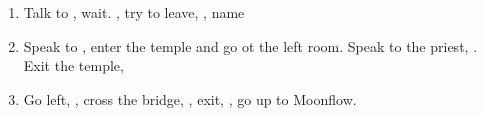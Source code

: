 \begin{enumerate}[resume]
	\item Talk to \auron, wait. \sd, try to leave, \sd, name \ixilon
	\item Speak to \auron, enter the temple and go ot the left room. Speak to the priest, \sd. Exit the temple, \sd
	\item Go left, , cross the bridge, \sd, exit, \sd, go up to Moonflow.
\end{enumerate}